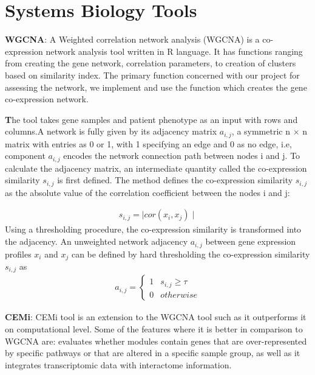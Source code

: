\documentclass[a4paper]{paper}
\begin{document}
\section{Systems Biology Tools}

\begin{flushleft}
\textbf{WGCNA}: A Weighted correlation network analysis (WGCNA) is a co-expression network analysis tool written in R language. It has functions ranging from creating the gene network, correlation parameters, to creation of clusters based on similarity index. The primary function concerned with our project for assessing the network, we implement and use the function which creates the gene co-expression network. 
\end{flushleft}

\begin{flushleft}
\textbf The tool takes gene samples and patient phenotype as an input with rows and columns.A network is fully given by its adjacency matrix $a_{i,j}$, a symmetric n × n matrix with entries as 0 or 1, with 1 specifying an edge and 0 as no edge, i.e, component $a_{i,j}$ encodes the network connection path between nodes i and j. To calculate the adjacency matrix, an intermediate quantity called the co-expression similarity $s_{i,j}$ is first defined. The method defines the co-expression similarity $s_{i,j}$ as the absolute value of the correlation coefficient between the nodes i and j:
\end{flushleft}
\begin{align}
s_{i,j} = \mid cor(x_{i},x_{j})\mid
\end{align}
 Using a thresholding procedure, the co-expression similarity is transformed into the adjacency. An unweighted
network adjacency $a_{i,j}$ between gene expression profiles $x_{i}$
and $x_{j}$ can be defined by hard thresholding the co-expression similarity $s_{i,j}$ as 
\begin{align}
a_{i,j} = \begin{cases}1 & s_{i,j} \geq\tau\\0& otherwise\end{cases}
\end{align}

 \bigskip
 
 \begin{flushleft}
\textbf{CEMi}: CEMi tool is an extension to the WGCNA tool such as it outperforms it on computational level. Some of the features where it is better in comparison to WGCNA are:  evaluates whether modules contain genes that are over-represented by specific pathways or that are altered in a specific sample group, as well as it integrates transcriptomic data with interactome information. 
\end{flushleft}
\end{document}
